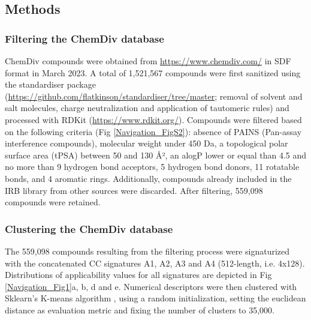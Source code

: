 \subsection{Methods}
\label{Navigation_Methods}



\subsubsection{Filtering the ChemDiv database}

ChemDiv compounds were obtained from \hyperlink{https://www.chemdiv.com/}{https://www.chemdiv.com/} in SDF format in March 2023. A total of 1,521,567 compounds were first sanitized using the standardiser package (\hyperlink{https://github.com/flatkinson/standardiser/tree/master}{https://github.com/flatkinson/standardiser/tree/master}; removal of solvent and salt molecules, charge neutralization and application of tautomeric rules) and processed with RDKit (\hyperlink{https://www.rdkit.org/}{https://www.rdkit.org/}). Compounds were filtered based on the following criteria (Fig \ref{Navigation_FigS2}): absence of PAINS\cite{baell_chemistry_2014} (Pan-assay interference compounds), molecular weight under 450 Da, a topological polar surface area (tPSA) between 50 and 130 Å², an alogP lower or equal than 4.5 and no more than 9 hydrogen bond acceptors, 5 hydrogen bond donors, 11 rotatable bonds, and 4 aromatic rings. Additionally, compounds already included in the IRB library from other sources were discarded. After filtering, 559,098 compounds were retained.


\subsubsection{Clustering the ChemDiv database}

The 559,098 compounds resulting from the filtering process were signaturized with the concatenated CC signatures A1, A2, A3 and A4 (512-length, i.e. 4x128). Distributions of applicability values for all signatures are depicted in Fig \ref{Navigation_Fig1}a, b, d and e. Numerical descriptors were then clustered with Sklearn’s K-means algorithm \cite{pedregosa_scikit-learn_nodate}, using a random initialization, setting the euclidean distance as evaluation metric and fixing the number of clusters to 35,000. 
